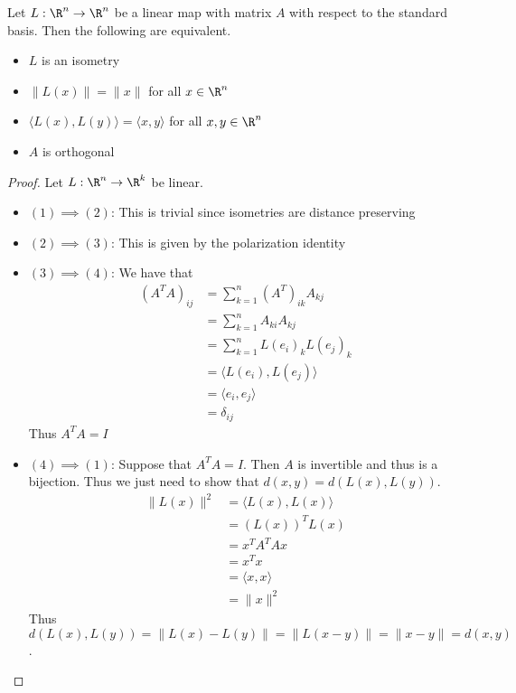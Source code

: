 \begin{prp}{}{} Let $L:\R^n\to\R^n$ be a linear map with matrix $A$ with respect to the standard basis. Then the following are equivalent. 
\begin{itemize}
\item $L$ is an isometry
\item $\|L(x)\|=\|x\|$ for all $x\in\R^n$
\item $\langle L(x),L(y)\rangle=\langle x,y\rangle$ for all $x,y\in\R^n$
\item $A$ is orthogonal
\end{itemize}\tcbline
\begin{proof} Let $L:\R^n\to\R^k$ be linear. 
\begin{itemize}
\item $(1)\implies(2)$: This is trivial since isometries are distance preserving
\item $(2)\implies(3)$: This is given by the polarization identity
\item $(3)\implies(4)$: We have that  
\begin{align*}
\left(A^TA\right)_{ij}&=\sum_{k=1}^n(A^T)_{ik}A_{kj}\\
&=\sum_{k=1}^nA_{ki}A_{kj}\\
&=\sum_{k=1}^nL(e_i)_kL(e_j)_k\\
&=\langle L(e_i),L(e_j)\rangle\\
&=\langle e_i,e_j\rangle\tag{By $(3)$}\\
&=\delta_{ij}
\end{align*} Thus $A^TA=I$
\item $(4)\implies(1)$: Suppose that $A^TA=I$. Then $A$ is invertible and thus is a bijection. Thus we just need to show that $d(x,y)=d(L(x),L(y))$.
\begin{align*}
\|L(x)\|^2&=\langle L(x),L(x)\rangle\\
&=(L(x))^TL(x)\\
&=x^TA^TAx\\
&=x^Tx\\
&=\langle x,x\rangle\\
&=\|x\|^2
\end{align*}
Thus $d(L(x),L(y))=\|L(x)-L(y)\|=\|L(x-y)\|=\|x-y\|=d(x,y)$. 
\end{itemize}
\end{proof}
\end{prp}

